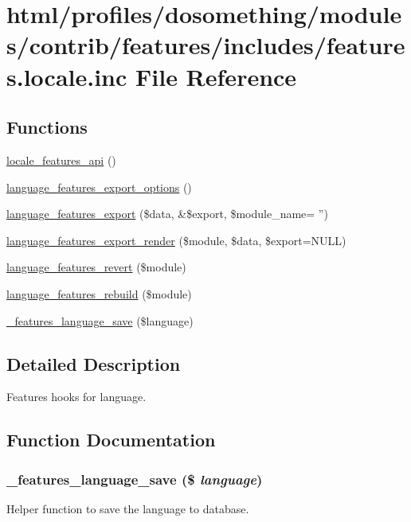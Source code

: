 \hypertarget{features_8locale_8inc}{
\section{html/profiles/dosomething/modules/contrib/features/includes/features.locale.inc File Reference}
\label{features_8locale_8inc}
}
\subsection*{Functions}
\begin{DoxyCompactItemize}
\item 
\hyperlink{features_8locale_8inc_a4436c1b5cde316e9831ccc36d24505cb}{locale\_\-features\_\-api} ()
\item 
\hyperlink{features_8locale_8inc_a1bd90e5855e637efaa9d3ab7efff7ce8}{language\_\-features\_\-export\_\-options} ()
\item 
\hyperlink{features_8locale_8inc_a9cba8a9e6b287fb52f235b0fa6abfb1a}{language\_\-features\_\-export} (\$data, \&\$export, \$module\_\-name= '')
\item 
\hyperlink{features_8locale_8inc_ac6d5aee947234fef3a30f79700e27389}{language\_\-features\_\-export\_\-render} (\$module, \$data, \$export=NULL)
\item 
\hyperlink{features_8locale_8inc_a103f8aaefec6c5034ca55431cae83336}{language\_\-features\_\-revert} (\$module)
\item 
\hyperlink{features_8locale_8inc_a16d6aa7d5802ae4863d732698b776e1f}{language\_\-features\_\-rebuild} (\$module)
\item 
\hyperlink{features_8locale_8inc_a19a7903ee4af263f01abec0856f8d527}{\_\-features\_\-language\_\-save} (\$language)
\end{DoxyCompactItemize}


\subsection{Detailed Description}
Features hooks for language. 

\subsection{Function Documentation}
\hypertarget{features_8locale_8inc_a19a7903ee4af263f01abec0856f8d527}{
\subsubsection[{\_\-features\_\-language\_\-save}]{\setlength{\rightskip}{0pt plus 5cm}\_\-features\_\-language\_\-save (\$ {\em language})}}
\label{features_8locale_8inc_a19a7903ee4af263f01abec0856f8d527}
Helper function to save the language to database.

